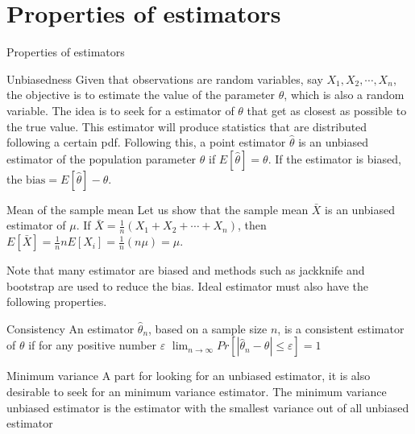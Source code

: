 \documentclass[8pt]{beamer}
\renewcommand{\emph}[1]{\textcolor{myorange}{#1}}
\begin{document}
\section{Properties of estimators}
\begin{frame}{Properties of estimators}
    
    \begin{block}{Unbiasedness}
        Given that observations are random variables, say  $X_1, X_2, \cdots, X_n$, the objective is to estimate the value of the parameter $\theta$, which is also a random variable. The idea is to seek for a \emph{estimator} of  $\theta$ that get as closest as possible to the \emph{true value}. This estimator will produce statistics that are distributed following a certain \emph{pdf}. Following this, a \alert{point estimator $\hat{\theta}$}  is an \alert{unbiased estimator} of the population parameter $\theta$ if $E[\hat{\theta}] = \theta$. If the estimator is biased, the $\text{bias} = E[\hat{\theta}] - \theta$.
    \end{block}
    
    \begin{exampleblock}{Mean of the sample mean}
        Let us show that the sample mean $\bar{X}$ is an unbiased estimator of $\mu$. If $\bar{X} = \frac{1}{n} \left( X_1 + X_2 + \cdots + X_n \right) $, then $E[\bar{X}] = \frac{1}{n} nE[X_i] = \frac{1}{n} (n \mu) = \mu$. 
    \end{exampleblock}
    Note that many estimator are biased and methods such as \emph{jackknife} and \emph{bootstrap} are used to reduce the bias. Ideal estimator must also have the following properties. 
    \begin{block}{Consistency}
        An estimator $\hat{\theta}_n$, based on a sample size $n$, is a \alert{consistent} estimator of $\theta$ if for any positive number $\varepsilon$ $\lim_{n\rightarrow \infty} Pr[ | \hat{\theta}_n - \theta | \leq \varepsilon ] = 1$
    \end{block}

    \begin{block}{Minimum variance}
        A part for looking for an unbiased estimator, it is also desirable to seek for an \alert{minimum variance estimator}. The \emph{minimum variance unbiased estimator} is the estimator with the smallest variance out of all unbiased estimator
    \end{block}


\end{frame}
    
\end{document}
